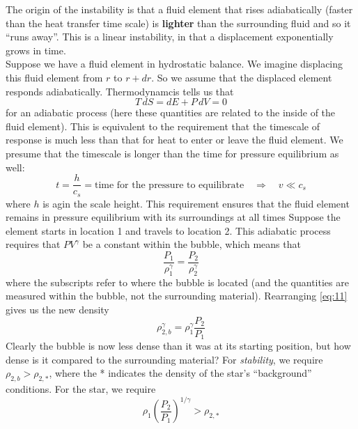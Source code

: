 \documentclass[10pt]{article}
\numberwithin{equation}{section}
\newcommand{\n}{\noindent}
\begin{document}
\n The origin of the instability is that a fluid element that rises
adiabatically (faster than the heat transfer time scale) is
\textbf{lighter} than the surrounding fluid and so it
``runs away''. This is a linear instability, in that a displacement
exponentially grows in time. \\

\n Suppose we have a fluid element in hydrostatic balance. We imagine
displacing this fluid element from $r$ to $r+dr$. So we assume that
the displaced element responds adiabatically. Thermodynamcis tells us
that
\begin{equation}
  \label{eq:9}
  T\,dS=dE+P\,dV=0
\end{equation}
for an adiabatic process (here these quantities are related to the
inside of the fluid element). This is equivalent to the requirement that
the timescale of response is much less than that for heat to enter or
leave the fluid element. We presume that the timescale is longer than
the time for pressure equilibrium as well:
\begin{equation}
  \label{eq:10}
  t=\frac{h}{c_s}=\textrm{time for the pressure to
    equilibrate}\quad\Rightarrow\quad v\ll c_s
\end{equation}
where $h$ is agin the scale height. This requirement ensures that the
fluid element remains in pressure equilibrium with its surroundings at
all times Suppose the element starts in
location 1 and travels to location 2. This adiabatic process requires
that $PV^\gamma$ be a constant within the bubble, which means that
\begin{equation}
  \label{eq:11}
  \frac{P_1}{\rho_1^\gamma}=\frac{P_2}{\rho_2^\gamma}
\end{equation}
where the subscripts refer to where the bubble is located (and the
quantities are measured within the bubble, not the surrounding
material). Rearranging
\eqref{eq:11} gives us the new density
\begin{equation}
  \label{eq:12}
  \rho_{2,b}^\gamma=\rho_1^\gamma\frac{P_2}{P_1}
\end{equation}
Clearly the bubble is now less dense than it was at its starting
position, but how dense is it compared to the surrounding material?
For \emph{stability}, we require $\rho_{2,b}>\rho_{2,*}$, where the * 
indicates the
density of the star's ``background'' conditions. For the star, we
require
\begin{equation}
  \label{eq:13}
  \rho_1\left(\frac{P_2}{P_1}\right)^{1/\gamma}>\rho_{2,*}
\end{equation}
\end{document}
